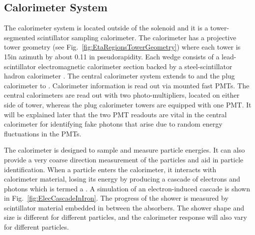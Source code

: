 \subsection{Calorimeter System}\label{sec:Calorimeter}
The calorimeter system is located outside of the solenoid and it is a tower-segmented scintillator sampling calorimeter. The calorimeter has a projective tower geometry (see Fig.~\ref{fig:EtaRegionsTowerGeometry}) where each tower is 15\degree in azimuth by about 0.11 in pseudorapidity. Each wedge consists of a lead-scintillator electromagnetic calorimeter section backed by a steel-scintillator hadron calorimeter \cite{pap:CDFTDR}. The central calorimeter system extends to  and the plug calorimeter to . Calorimeter information is read out via mounted fast PMTs. The central calorimeters are read out with two photo-multipliers, located on either side of tower, whereas the plug calorimeter towers are equipped with one PMT. It will be explained later that the two PMT readouts are vital in the central calorimeter for identifying fake photons that arise due to random energy fluctuations in the PMTs.

The calorimeter is designed to sample and measure particle energies. It can also provide a very coarse direction measurement of the particles and aid in particle identification. When a particle enters the calorimeter, it interacts with calorimeter material, losing its energy by producing a cascade of electrons and photons which is termed a . A simulation of an electron-induced cascade is shown in Fig.~\ref{fig:ElecCascadeInIron}. The progress of the shower is measured by scintillator material embedded in between the absorbers. The shower shape and size is different for different particles, and the calorimeter response will also vary for different particles.

